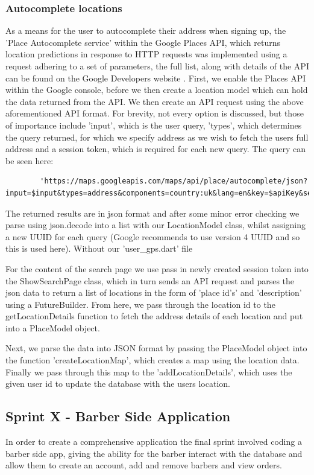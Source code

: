 \documentclass[12pt]{article}
\begin{document}
	
	\subsubsection{Autocomplete locations}
	As a means for the user to autocomplete their address when signing up, the 'Place Autocomplete service' within the Google Places API, which returns location predictions in response to HTTP requests was implemented using a request adhering to a set of parameters, the full list, along with details of the API can be found on the Google Developers website \cite{requests}.
	First, we enable the Places API within the Google console, before we then create a location model which can hold the data returned from the API. We then create an API request using the above aforementioned API format. For brevity, not every option is discussed, but those of importance include 'input', which is the user query, 'types', which determines the query returned, for which we specify address as we wish to fetch the users full address and a session token, which is required for each new query. The query can be seen here:
	\begin{lstlisting}
		'https://maps.googleapis.com/maps/api/place/autocomplete/json?input=$input&types=address&components=country:uk&lang=en&key=$apiKey&sessiontoken=$sessionToken'
	\end{lstlisting}
	The returned results are in json format and after some minor error checking we parse using json.decode into a list with our LocationModel class, whilst assigning a new UUID for each query (Google recommends to use version 4 UUID and so this is used here). Without our 'user\_gps.dart' file
	
	For the content of the search page we use pass in newly created session token into the ShowSearchPage class, which in turn sends an API request and parses the json data to return a list of locations in the form of 'place id's' and 'description' using a FutureBuilder. From here, we pass through the location id to the getLocationDetails function to fetch the address details of each location and put into a PlaceModel object.
	
	Next, we parse the data into JSON format by passing the PlaceModel object into the function 'createLocationMap', which creates a map using the location data. Finally we pass through this map to the 'addLocationDetails', which uses the given user id to update the database with the users location.
	
	\subsection{Sprint X - Barber Side Application}
	In order to create a comprehensive application the final sprint involved coding a barber side app, giving the ability for the barber interact with the database and allow them to create an account, add and remove barbers and view orders.
	
\end{document}
